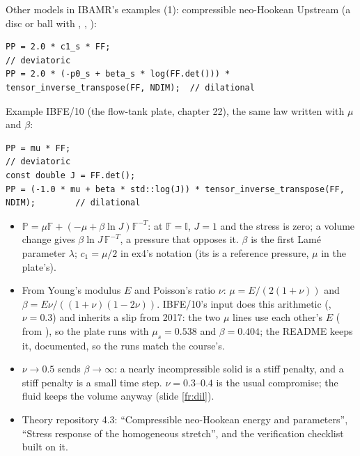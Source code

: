 \documentclass[aspectratio=169,11pt]{beamer}
\begin{document}
\begin{frame}[fragile]{Other models in IBAMR's examples (1): compressible neo-Hookean}
\label{fr:compressible}
\scriptsize
Upstream  (a disc or ball with , , ):
\begin{lstlisting}[style=cpptiny]
PP = 2.0 * c1_s * FF;                                                              // deviatoric
PP = 2.0 * (-p0_s + beta_s * log(FF.det())) * tensor_inverse_transpose(FF, NDIM);  // dilational
\end{lstlisting}
Example IBFE/10 (the flow-tank plate, chapter 22), the same law written with $\mu$ and $\beta$:
\begin{lstlisting}[style=cpptiny]
PP = mu * FF;                                                                       // deviatoric
const double J = FF.det();
PP = (-1.0 * mu + beta * std::log(J)) * tensor_inverse_transpose(FF, NDIM);        // dilational
\end{lstlisting}
\begin{itemize}
  \item $\mathbb{P} = \mu\mathbb{F} + (-\mu + \beta\ln J)\mathbb{F}^{-T}$: at $\mathbb{F} = \mathbb{I}$, $J = 1$ and the stress is zero; a volume change gives $\beta\ln J\,\mathbb{F}^{-T}$, a pressure that opposes it. $\beta$ is the first Lam\'e parameter $\lambda$; $c_1 = \mu/2$ in ex4's notation (its  is a reference pressure, $\mu$ in the plate's).
  \item From Young's modulus $E$ and Poisson's ratio $\nu$: $\mu = E/(2(1+\nu))$ and $\beta = E\nu/((1+\nu)(1-2\nu))$. IBFE/10's input does this arithmetic (, $\nu = 0.3$) and inherits a slip from 2017: the two $\mu$ lines use each other's $E$ ( from ), so the plate runs with $\mu_s = 0.538$ and $\beta = 0.404$; the README keeps it, documented, so the runs match the course's.
  \item $\nu \to 0.5$ sends $\beta \to \infty$: a nearly incompressible solid is a stiff penalty, and a stiff penalty is a small time step. $\nu = 0.3$--$0.4$ is the usual compromise; the fluid keeps the volume anyway (slide \ref{fr:dil}).
  \item Theory repository 4.3: ``Compressible neo-Hookean energy and parameters'', ``Stress response of the homogeneous stretch'', and the verification checklist built on it.
\end{itemize}
\end{frame}
\end{document}

